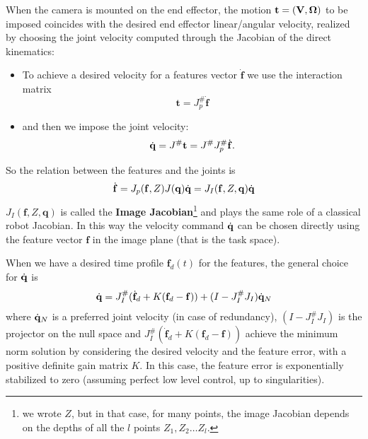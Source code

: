 \documentclass[10pt, a4paper]{report}
\newcommand{\q}{{\mathbf q}}
\begin{document}
When the camera is mounted on the end effector, the motion $\mathbf t=(\mathbf V,{\boldsymbol{\Omega}})$ to be imposed coincides with the desired end effector linear/angular velocity, realized by choosing the joint velocity computed through the Jacobian of the direct kinematics:\begin{itemize}
    \item To achieve a desired velocity for a features vector ${\dot{\mathbf f}}$ we use the interaction matrix
    $$ 
    \mathbf t=J_p^\#{\dot{\mathbf f}} 
    $$
    \item and then we impose the joint velocity:\begin{equation}
        {\dot{\mathbf q}}=J^\#\mathbf t=J^\#J_p^\#{\dot{\mathbf f}}.
    \end{equation}
\end{itemize}
So the relation between the features and the joints is\begin{equation}
    \dot{\mathbf f}=J_p(\mathbf f,Z)J(\q)\dq=J_I(\mathbf f,Z,\q)\dq
\end{equation}
$J_I(\mathbf f,Z,\q)$ is called the \textbf{Image Jacobian}\footnote{
    we wrote $Z$, but in that case, for many points, the image Jacobian depends on the depths of all the $l$ points $Z_1,Z_2\dots Z_l$. 
} and plays the same
role of a classical robot Jacobian. In this way the velocity command ${\dot{\mathbf q}}$ can be chosen directly using the feature vector $\mathbf f$ in the image plane (that is the task space). 

When we have a desired time profile $\mathbf f_d(t)$ for the features, the general choice for ${\dot{\mathbf q}}$ is\begin{equation}
    {\dot{\mathbf q}}=J_I^\#(\dot{\mathbf f}_d+K(\mathbf f_d-\mathbf f))+(I-J_I^\#J_I){\dot{\mathbf q}}_N
\end{equation}
where ${\dot{\mathbf q}}_N$ is a preferred joint velocity (in case of redundancy), $(I-J_I^\#J_I)$ is the projector on the null space and $J_I^\#(\dot{\mathbf f}_d+K(\mathbf f_d-\mathbf f))$ achieve the minimum norm solution by considering the desired velocity and the feature error, with a positive definite gain matrix $K$. In this case, the feature error is exponentially stabilized to zero (assuming perfect low level control, up to singularities).
\end{document}
